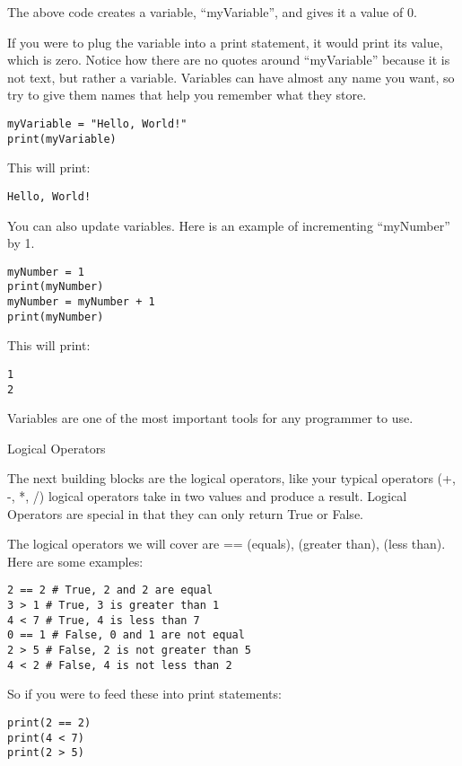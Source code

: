 \documentclass[12pt,oneside]{article}
\newcommand{\q}[1]{``#1''}
\newcommand{\subsectitle}[1]{
  \begin{flushleft}{\large#1}\end{flushleft}
}
\begin{document}
The above code creates a variable, \q{myVariable}, and gives it a value of 0. 

If you were to plug the variable into a print statement, it would print its value, which is zero. Notice how there are no quotes around \q{myVariable} because it is not text, but rather a variable. Variables can have almost any name you want, so try to give them names that help you remember what they store.

\begin{lstlisting}
myVariable = "Hello, World!"
print(myVariable)
\end{lstlisting}

This will print:

\begin{lstlisting}
Hello, World!
\end{lstlisting}

You can also update variables. Here is an example of incrementing \q{myNumber} by 1.

\begin{lstlisting}
myNumber = 1
print(myNumber)
myNumber = myNumber + 1
print(myNumber)
\end{lstlisting}

This will print:

\begin{lstlisting}
1
2
\end{lstlisting}

Variables are one of the most important tools for any programmer to use.

\subsectitle{Logical Operators}

The next building blocks are the logical operators, like your typical operators (+, -, *, /) logical operators take in two values and produce a result. Logical Operators are special in that they can only return True or False. 

The logical operators we will cover are == (equals), \> (greater than), \< (less than). Here are some examples:

\begin{lstlisting}
2 == 2 # True, 2 and 2 are equal
3 > 1 # True, 3 is greater than 1
4 < 7 # True, 4 is less than 7
0 == 1 # False, 0 and 1 are not equal
2 > 5 # False, 2 is not greater than 5
4 < 2 # False, 4 is not less than 2
\end{lstlisting}

So if you were to feed these into print statements:

\begin{lstlisting}
print(2 == 2)
print(4 < 7)
print(2 > 5)
\end{lstlisting}
\end{document}
